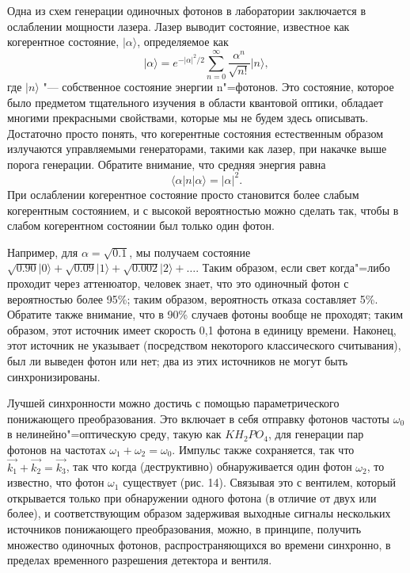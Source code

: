 \begin{multicols}{2}
{        Одна из схем генерации одиночных фотонов в лаборатории заключается в ослаблении мощности
        лазера. Лазер выводит состояние, известное как когерентное состояние, $\vert\alpha\rangle$, определяемое как
        \begin{equation}
            \vert\alpha\rangle=e^{-\vert\alpha\vert^2/2}\sum_{n = 0}^{\infty}  \frac{\alpha^n}{\sqrt{n!}}\vert n\rangle,
        \end{equation}
        где $\vert n\rangle$ "--- собственное состояние энергии n"=фотонов. Это состояние, которое было предметом
        тщательного изучения в области квантовой оптики, обладает многими прекрасными свойствами, которые мы
        не будем здесь описывать. Достаточно просто понять, что когерентные состояния естественным
        образом излучаются управляемыми генераторами, такими как лазер, при накачке выше порога генерации.
        Обратите внимание, что средняя энергия равна
        \begin{equation}
            \langle\alpha\vert n\vert\alpha\rangle=\vert\alpha\vert^2.
        \end{equation}
        При ослаблении когерентное состояние просто
        становится более слабым когерентным состоянием, и с высокой вероятностью можно сделать так, чтобы в слабом когерентном состоянии был только один фотон.

        Например, для $\alpha=\sqrt{0.1}$, мы получаем состояние $\sqrt{0.90}\vert0\rangle+\sqrt{0.09}\vert1\rangle+\sqrt{0.002}\vert2\rangle+\ldots$.
        Таким образом, если свет когда"=либо проходит через аттенюатор, человек знает, что это одиночный фотон с
        вероятностью более 95\%; таким образом, вероятность отказа составляет 5\%. Обратите также внимание, что в 90\%
        случаев фотоны вообще не проходят; таким образом, этот источник имеет скорость 0,1 фотона в единицу
        времени. Наконец, этот источник не указывает (посредством некоторого классического считывания),
        был ли выведен фотон или нет; два из этих источников не могут быть синхронизированы.

        Лучшей синхронности можно достичь с помощью параметрического понижающего преобразования. Это включает
        в себя отправку фотонов частоты $\omega_0$ в нелинейно"=оптическую среду, такую как $KH_2PO_4$, для
        генерации пар фотонов на частотах $\omega_1 + \omega_2 = \omega_0$. Импульс также сохраняется, так что 
        $\vec{k_1}+\vec{k_2}=\vec{k_3}$, так что когда (деструктивно) обнаруживается один фотон $\omega_2$, то 
        известно, что фотон $\omega_1$ существует (рис. 14).  Связывая это с вентилем, который открывается
        только при обнаружении одного фотона (в отличие от двух или более), и соответствующим образом
        задерживая выходные сигналы нескольких источников понижающего преобразования, можно, в принципе, получить
        множество одиночных фотонов, распространяющихся во времени синхронно, в пределах временного разрешения
        детектора и вентиля. 

}
\end{multicols}
